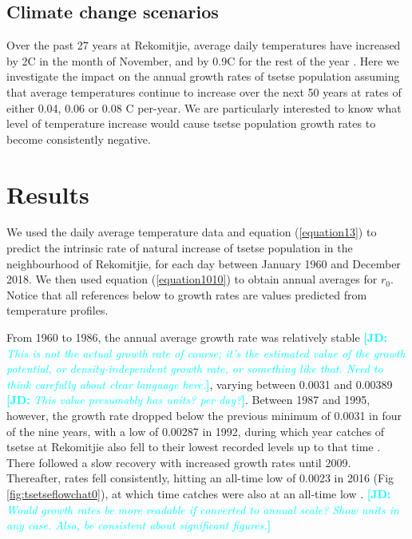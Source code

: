 \documentclass[12pt,a4paper]{article}
\newcommand{\comment}[3]{\textcolor{#1}{\textbf{[#2: }\textsl{#3}\textbf{]}}}
\newcommand{\jd}[1]{\comment{cyan}{JD}{#1}}
\begin{document}
\newpage
\subsection*{Climate change scenarios}

Over the past 27 years at Rekomitjie, average daily temperatures have increased by 2\textdegree C in the month of November, and by 0.9\textdegree C for the rest of the year \cite{Lord2018}.  Here we investigate the impact on the annual growth rates of tsetse population assuming that average temperatures continue to increase over the next 50 years at rates of either 0.04, 0.06 or 0.08 \textdegree C per-year. We are particularly interested to know what level of temperature increase would cause tsetse population growth rates to become consistently negative.

\section*{Results}
We used the daily average temperature data and equation (\ref{equation13}) to predict the intrinsic rate of natural increase of tsetse population in the neighbourhood of Rekomitjie, for each day between January 1960 and December 2018. We then used equation (\ref{equation1010}) to obtain annual averages for $r_0$. Notice that all references below to growth rates are values predicted from temperature profiles.   

From 1960 to 1986, the annual average growth rate was relatively stable \jd{This is not the actual growth rate of course; it's the estimated value of the growth potential, or density-independent growth rate, or something like that. Need to think carefully about clear language here.}, varying between 0.0031 and 0.00389 \jd{This value presumably has units? per day?}.  Between 1987 and 1995, however, the growth rate dropped below the previous minimum of 0.0031 in four of the nine years, with a low of 0.00287 in 1992, during which year catches of tsetse at Rekomitjie also fell to their lowest recorded levels up to that time \cite{hargrove2015mortality}. There followed a slow recovery with increased growth rates until 2009. Thereafter, rates fell consistently, hitting an all-time low of 0.0023 in 2016 (Fig \ref{fig:tsetseflowchat0}), at which time catches were also at an all-time low \cite{Lord2018}. \jd{Would growth rates be more readable if converted to annual scale? \emph{Show} units in any case. Also, be consistent about significant figures.}
\end{document}
